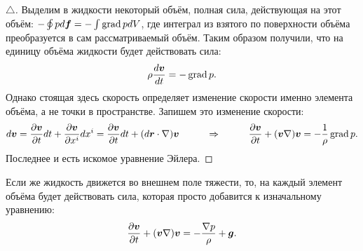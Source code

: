\begin{to_thr}
\phantom{239}

\begin{proof}[$\triangle$]
	Выделим в жидкости некоторый объём, полная сила, действующая на этот объём: $- \oint p d \mbox{\boldmath $f$} = - \int \mathop{\mathrm{grad}}\nolimits p d V$, где интеграл из взятого по поверхности объёма преобразуется в сам рассматриваемый объём.
	Таким образом получили, что на единицу объёма жидкости будет действовать сила:
	\begin{equation*}
		\rho \frac{d \mbox{\boldmath $v$}}{d t} = - \mathop{\mathrm{grad}}\nolimits p.
	\end{equation*}
	Однако стоящая здесь скорость определяет изменение скорости именно элемента объёма, а не точки в пространстве.
	Запишем это изменение скорости:
	\begin{equation*}
		d \mbox{\boldmath $v$} 
		=
		 \frac{\partial \mbox{\boldmath $v$}}{\partial t} d t + \frac{\partial \mbox{\boldmath $v$}}{\partial x^i} d x^i 
		= 
		\frac{\partial \mbox{\boldmath $v$}}{\partial t} d t + (d \mbox{\boldmath $r$} \cdot \nabla) \mbox{\boldmath $v$}
		\hspace*{1 cm}
		\Rightarrow
		\hspace*{1 cm}
		\frac{\partial \mbox{\boldmath $v$}}{\partial t} + (\mbox{\boldmath $v$} \nabla) \mbox{\boldmath $v$} = - \frac{1}{\rho} \mathop{\mathrm{grad}}\nolimits p.
	\end{equation*}
	Последнее и есть искомое уравнение Эйлера.
\end{proof}
\end{to_thr}

Если же жидкость движется во внешнем поле тяжести, то, на каждый элемент объёма будет действовать сила, которая просто добавится к изначальному уравнению: 
\begin{equation*}
	\frac{\partial \mbox{\boldmath $v$}}{\partial t} + (\mbox{\boldmath $v$} \nabla) \mbox{\boldmath $v$} = - \frac{\nabla p}{\rho} + \mbox{\boldmath $g$}.
\end{equation*}

